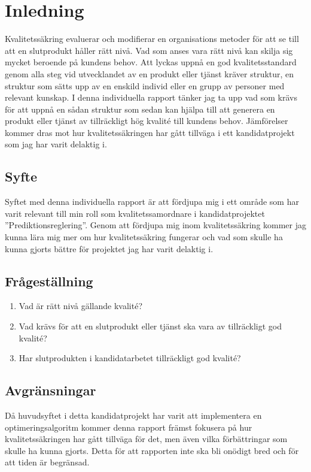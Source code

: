 \section{Inledning}
Kvalitetssäkring evaluerar och modifierar en organisations metoder för att se till att en slutprodukt håller rätt nivå. Vad som anses vara rätt nivå kan skilja sig mycket beroende på kundens behov. 
\newline
\newline
Att lyckas uppnå en god kvalitetsstandard genom alla steg vid utvecklandet av en produkt eller tjänst kräver struktur, en struktur som sätts upp av en enskild individ eller en grupp av personer med relevant kunskap. I denna individuella rapport tänker jag ta upp vad som krävs för att uppnå en sådan struktur som sedan kan hjälpa till att generera en produkt eller tjänst av tillräckligt hög kvalité till kundens behov. Jämförelser kommer dras mot hur kvalitetssäkringen har gått tillväga i ett kandidatprojekt som jag har varit delaktig i.

\subsection{Syfte}
Syftet med denna individuella rapport är att fördjupa mig i ett område som har varit relevant till min roll som kvalitetssamordnare i kandidatprojektet ''Prediktionsreglering''. 
\newline
\newline
Genom att fördjupa mig inom kvalitetssäkring kommer jag kunna lära mig mer om hur kvalitetssäkring fungerar och vad som skulle ha kunna gjorts bättre för projektet jag har varit delaktig i.

\subsection{Frågeställning}

\begin{enumerate}
  \item Vad är rätt nivå gällande kvalité?
  \item Vad krävs för att en slutprodukt eller tjänst ska vara av tillräckligt god kvalité?
  \item Har slutprodukten i kandidatarbetet tillräckligt god kvalité?
\end{enumerate}

\subsection{Avgränsningar}

Då huvudsyftet i detta kandidatprojekt har varit att implementera en optimeringsalgoritm kommer denna rapport främst fokusera på hur kvalitetssäkringen har gått tillväga för det, men även vilka förbättringar som skulle ha kunna gjorts. Detta för att rapporten inte ska bli onödigt bred och för att tiden är begränsad.


